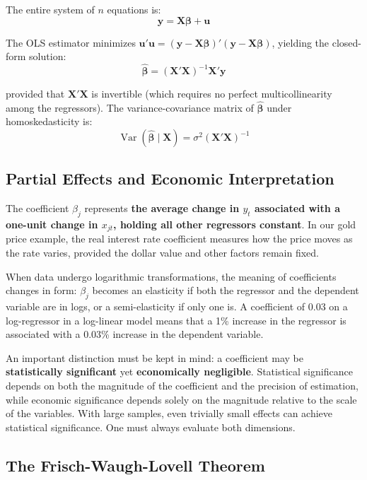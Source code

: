The entire system of $n$ equations is:
$$\mathbf{y} = \mathbf{X}\boldsymbol{\beta} + \mathbf{u}$$

The OLS estimator minimizes $\mathbf{u}'\mathbf{u} = (\mathbf{y} - \mathbf{X}\boldsymbol{\beta})'(\mathbf{y} - \mathbf{X}\boldsymbol{\beta})$, yielding the closed-form solution:
$$\hat{\boldsymbol{\beta}} = (\mathbf{X}'\mathbf{X})^{-1}\mathbf{X}'\mathbf{y}$$

provided that $\mathbf{X}'\mathbf{X}$ is invertible (which requires no perfect multicollinearity among the regressors). The variance-covariance matrix of $\hat{\boldsymbol{\beta}}$ under homoskedasticity is:
$$\operatorname{Var}(\hat{\boldsymbol{\beta}} \mid \mathbf{X}) = \sigma^2 (\mathbf{X}'\mathbf{X})^{-1}$$
\subsection{Partial Effects and Economic Interpretation}

The coefficient $\beta_j$ represents \textbf{the average change in $y_t$ associated with a one-unit change in $x_{jt}$, holding all other regressors constant}. In our gold price example, the real interest rate coefficient measures how the price moves as the rate varies, provided the dollar value and other factors remain fixed.

When data undergo logarithmic transformations, the meaning of coefficients changes in form: $\beta_j$ becomes an elasticity if both the regressor and the dependent variable are in logs, or a semi-elasticity if only one is. A coefficient of 0.03 on a log-regressor in a log-linear model means that a 1\% increase in the regressor is associated with a 0.03\% increase in the dependent variable.

An important distinction must be kept in mind: a coefficient may be \textbf{statistically significant} yet \textbf{economically negligible}. Statistical significance depends on both the magnitude of the coefficient and the precision of estimation, while economic significance depends solely on the magnitude relative to the scale of the variables. With large samples, even trivially small effects can achieve statistical significance. One must always evaluate both dimensions.
\subsection{The Frisch-Waugh-Lovell Theorem}

